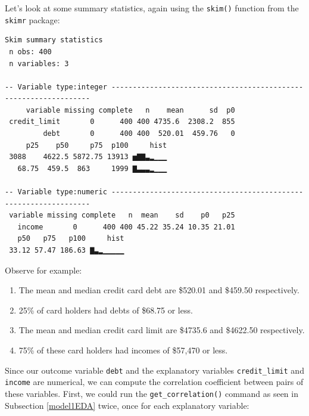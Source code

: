 \documentclass[12pt, krantz2,]{krantz}
\makeatletter
\newenvironment{Shaded}{\begin{snugshade}}{\end{snugshade}}
\newcommand{\KeywordTok}[1]{\textcolor[rgb]{0.27,0.27,0.27}{\textbf{#1}}}
\newcommand{\NormalTok}[1]{#1}
\newcommand{\OperatorTok}[1]{\textcolor[rgb]{0.43,0.43,0.43}{\textbf{#1}}}
\newcommand{\StringTok}[1]{\textcolor[rgb]{0.5,0.5,0.5}{#1}}
\providecommand{\tightlist}{%
  \setlength{\itemsep}{0pt}\setlength{\parskip}{0pt}}
\newenvironment{kframe}{%
\medskip{}
\setlength{\fboxsep}{.8em}
 \def\at@end@of@kframe{}%
 \ifinner\ifhmode%
  \def\at@end@of@kframe{\end{minipage}}%
  \begin{minipage}{\columnwidth}%
 \fi\fi%
 \def\FrameCommand##1{\hskip\@totalleftmargin \hskip-\fboxsep
 \colorbox{shadecolor}{##1}\hskip-\fboxsep
     \hskip-\linewidth \hskip-\@totalleftmargin \hskip\columnwidth}%
 \MakeFramed {\advance\hsize-\width
   \@totalleftmargin\z@ \linewidth\hsize
   \@setminipage}}%
 {\par\unskip\endMakeFramed%
 \at@end@of@kframe}
\renewenvironment{Shaded}{\begin{kframe}}{\end{kframe}}
\makeatother
\begin{document}
Let's look at some summary statistics, again using the \texttt{skim()} function from the \texttt{skimr} package:

\begin{Shaded}
\end{Shaded}

\begin{verbatim}
Skim summary statistics
 n obs: 400 
 n variables: 3 

-- Variable type:integer -----------------------------------------------------------------
     variable missing complete   n    mean      sd  p0
 credit_limit       0      400 400 4735.6  2308.2  855
         debt       0      400 400  520.01  459.76   0
     p25    p50     p75  p100     hist
 3088    4622.5 5872.75 13913 ▅▇▇▃▂▁▁▁
   68.75  459.5  863     1999 ▇▃▃▃▂▁▁▁

-- Variable type:numeric -----------------------------------------------------------------
 variable missing complete   n  mean    sd    p0   p25
   income       0      400 400 45.22 35.24 10.35 21.01
   p50   p75   p100     hist
 33.12 57.47 186.63 ▇▃▂▁▁▁▁▁
\end{verbatim}

Observe for example:

\begin{enumerate}
\def\labelenumi{\arabic{enumi}.}
\tightlist
\item
  The mean and median credit card debt are \$520.01 and \$459.50 respectively.
\item
  25\% of card holders had debts of \$68.75 or less.
\item
  The mean and median credit card limit are \$4735.6 and \$4622.50 respectively.
\item
  75\% of these card holders had incomes of \$57,470 or less.
\end{enumerate}

Since our outcome variable \texttt{debt} and the explanatory variables \texttt{credit\_limit} and \texttt{income} are numerical, we can compute the correlation coefficient between pairs of these variables. First, we could run the \texttt{get\_correlation()} command as seen in Subsection \ref{model1EDA} twice, once for each explanatory variable:
\end{document}
